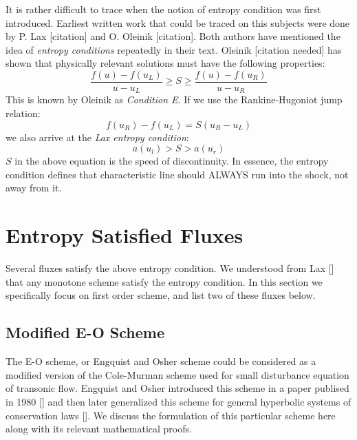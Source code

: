 \documentclass[a4paper]{article}
\begin{document}
It is rather difficult to trace when the notion of entropy condition was first introduced. Earliest written work that could be traced on this subjects were done by P. Lax [citation] and O. Oleinik [citation]. Both authors have mentioned the idea of \textit{entropy conditions} repeatedly in their text. Oleinik [citation needed] has shown that physically relevant solutions must have the following properties:
\begin{equation}
    \frac{f(u) - f(u_L)}{u-u_L} \geq S \geq \frac{f(u) - f(u_R)}{u-u_R}
\end{equation}
This is known by Oleinik as \textit{Condition E}. If we use the Rankine-Hugoniot jump relation:
\begin{equation}
    f(u_R) - f(u_L) = S(u_R - u_L)
\end{equation}
we also arrive at the \textit{Lax entropy condition}:
\begin{equation}
    a(u_l) > S > a(u_r)
\end{equation}
$S$ in the above equation is the speed of discontinuity. In essence, the entropy condition defines that characteristic line should ALWAYS run into the shock, not away from it. 

\section{Entropy Satisfied Fluxes}
Several fluxes satisfy the above entropy condition. We understood from Lax [] that any monotone scheme satisfy the entropy condition. In this section we specifically focus on first order scheme, and list two of these fluxes below.
\subsection{Modified E-O Scheme}
The E-O scheme, or Engquist and Osher scheme could be considered as a modified version of the Cole-Murman scheme used for small disturbance equation of transonic flow. Engquist and Osher introduced this scheme in a paper publised in 1980 [] and then later generalized this scheme for general hyperbolic systems of conservation laws []. We discuss the formulation of this particular scheme here along with its relevant mathematical proofs.
\end{document}
